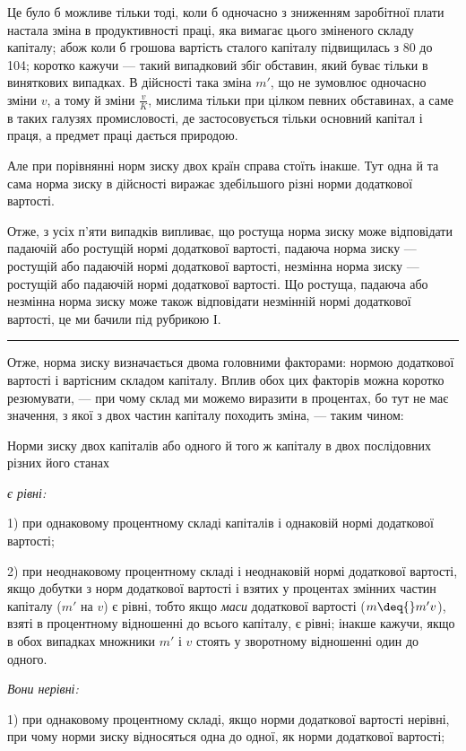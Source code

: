 
Це було б можливе тільки тоді, коли б одночасно з зниженням
заробітної плати настала зміна в продуктивності праці, яка
вимагає цього зміненого складу капіталу; абож коли б грошова вартість
сталого капіталу підвищилась з 80 до 104; коротко кажучи —
такий випадковий збіг обставин, який буває тільки в виняткових
випадках. В дійсності така зміна $m'$, що не зумовлює одночасно
зміни $v$, а тому й зміни $\frac{v}{K}$, мислима тільки при цілком певних
обставинах, а саме в таких галузях промисловості, де застосовується
тільки основний капітал і праця, а предмет праці дається
природою.

Але при порівнянні норм зиску двох країн справа стоїть
інакше. Тут одна й та сама норма зиску в дійсності виражає
здебільшого різні норми додаткової вартості.

Отже, з усіх п’яти випадків випливає, що ростуща норма
зиску може відповідати падаючій або ростущій нормі додаткової
вартості, падаюча норма зиску — ростущій або падаючій
нормі додаткової вартості, незмінна норма зиску — ростущій або
падаючій нормі додаткової вартості. Що ростуща, падаюча або
незмінна норма зиску може також відповідати незмінній нормі
додаткової вартості, це ми бачили під рубрикою І.

\pfbreak

Отже, норма зиску визначається двома головними факторами:
нормою додаткової вартості і вартісним складом капіталу.
Вплив обох цих факторів можна коротко резюмувати, — при чому
склад ми можемо виразити в процентах, бо тут не має значення,
з якої з двох частин капіталу походить зміна, — таким чином:

Норми зиску двох капіталів або одного й того ж капіталу
в двох послідовних різних його станах

\emph{є рівні:}

1) при однаковому процентному складі капіталів і однаковій
нормі додаткової вартості;

2) при неоднаковому процентному складі і неоднаковій нормі
додаткової вартості, якщо добутки з норм додаткової вартості
і взятих у процентах змінних частин капіталу ($m'$ на $v$) є рівні,
тобто якщо \emph{маси} додаткової вартості ($m \deq{} m'v$), взяті в процентному
відношенні до всього капіталу, є рівні; інакше кажучи,
якщо в обох випадках множники $m'$ і $v$ стоять у зворотному
відношенні один до одного.

\emph{Вони нерівні:}

1) при однаковому процентному складі, якщо норми додаткової
вартості нерівні, при чому норми зиску відносяться одна до
одної, як норми додаткової вартості;
\parbreak{}  %
